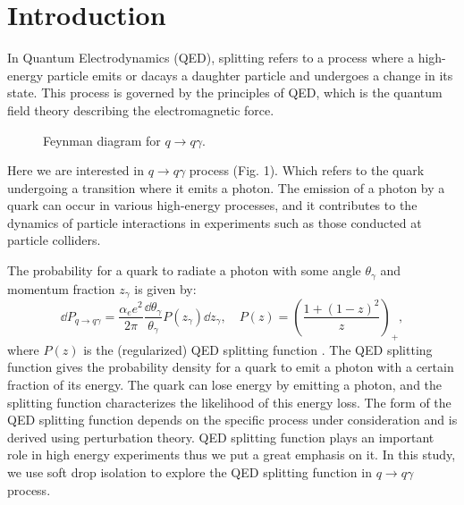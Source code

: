\documentclass[a4paper, 12pt]{article}
\begin{document}
\section{Introduction}
	In Quantum Electrodynamics (QED), splitting refers to a process where a high-energy particle emits or dacays a daughter 
	particle and undergoes a change in its state. This process is governed by the principles of QED, which is the quantum 
	field theory describing the electromagnetic force.\par
	\begin{figure}
		\centering
		\caption{Feynman diagram for \(q \rightarrow q\gamma\).}
		\label {fig:feynman}
	\end{figure}
	Here we are interested in  $q\rightarrow q\gamma$ process (Fig. 1). Which refers to the quark undergoing a transition where it
	emits a photon. The emission of a photon by a quark can occur in various high-energy processes, and it contributes to the
	dynamics of particle interactions in experiments such as those conducted at particle colliders.\par
	The probability for a quark to radiate a photon with some angle $\theta_{\gamma}$ and momentum fraction $z_{\gamma}$ is given by:
	\begin{equation}
		\dd P_{q\rightarrow q\gamma}=\frac{\alpha_ee^2}{2\pi}\frac{\dd \theta_{\gamma}}{\theta_{\gamma}}P(z_{\gamma})\dd z_{\gamma},\quad
		P(z)=\left(\frac{1+(1-z)^2}{z}\right)_+,
	\end{equation}
	where $P(z)$ is the (regularized) QED splitting function \cite{hall2018photon}. The QED splitting function gives the probability
	density for a quark to emit a photon with a certain fraction of its energy. The quark can lose energy by emitting a photon, and the
	splitting function characterizes the likelihood of this energy loss. The form of the QED splitting function depends on the specific
	process under consideration and is derived using perturbation theory. QED splitting function plays an important role in high 
	energy experiments thus we put a great emphasis on it. In this study, we use soft drop isolation to explore the QED splitting function
	in $q\rightarrow q\gamma$ process.
\end{document}
